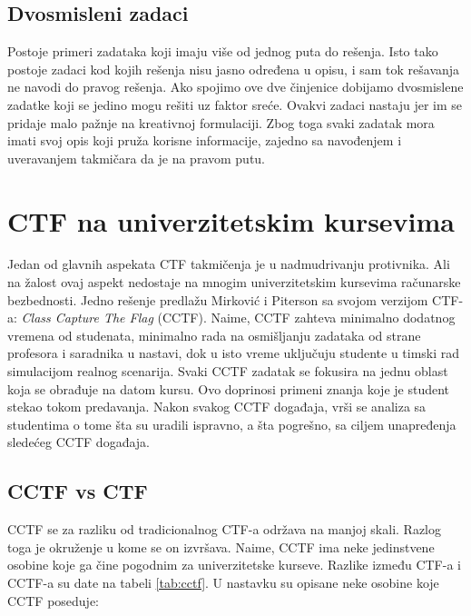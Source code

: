 \documentclass[12pt, a4paper, twocolumn]{article}
\begin{document}
\subsection{Dvosmisleni zadaci}

Postoje primeri zadataka koji imaju više od jednog puta do rešenja. Isto
tako postoje zadaci kod kojih rešenja nisu jasno određena u opisu, i
sam tok rešavanja ne navodi do pravog rešenja. Ako spojimo ove dve činjenice
dobijamo dvosmislene zadatke koji se jedino mogu rešiti uz faktor sreće.
Ovakvi zadaci nastaju jer im se pridaje malo pažnje na kreativnoj formulaciji. 
Zbog toga svaki zadatak mora imati svoj opis koji pruža korisne informacije, 
zajedno sa navođenjem i uveravanjem takmičara da je na pravom putu.

\section{CTF na univerzitetskim kursevima}

Jedan od glavnih aspekata CTF takmičenja je u nadmudrivanju protivnika. Ali na
žalost ovaj aspekt nedostaje na mnogim univerzitetskim kursevima računarske
bezbednosti. Jedno rešenje predlažu Mirković i Piterson \cite{ctf_class} sa
svojom verzijom CTF-a: \emph{Class Capture The Flag} (CCTF). Naime, CCTF
zahteva minimalno dodatnog vremena od studenata, minimalno rada na 
osmišljanju zadataka od strane profesora i saradnika u nastavi, dok u isto
vreme uključuju studente u timski rad simulacijom realnog scenarija.
Svaki CCTF zadatak se fokusira na jednu oblast koja se obrađuje na datom 
kursu. Ovo doprinosi primeni znanja koje je student stekao tokom predavanja.
Nakon svakog CCTF događaja, vrši se analiza sa studentima o tome šta su
uradili ispravno, a šta pogrešno, sa ciljem unapređenja sledećeg CCTF 
događaja. 

\subsection{CCTF vs CTF}

CCTF se za razliku od tradicionalnog CTF-a održava na manjoj skali. Razlog 
toga je okruženje u kome se on izvršava. Naime, CCTF ima neke jedinstvene
osobine koje ga čine pogodnim za univerzitetske kurseve. Razlike između
CTF-a i CCTF-a su date na tabeli \ref{tab:cctf}. U nastavku su opisane neke 
osobine koje CCTF poseduje:
\end{document}
